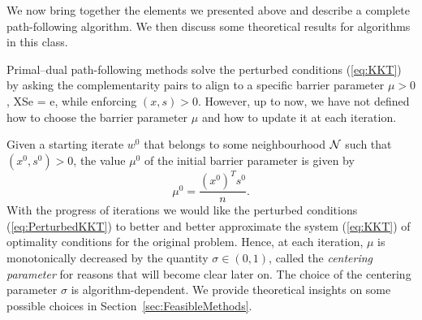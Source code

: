 We now bring together the elements we presented above and describe
a complete path-following algorithm. We then discuss some
theoretical results for algorithms in this class.

Primal--dual path-following methods solve the perturbed \KKT
conditions (\ref{eq:KKT}) by asking the complementarity pairs to align 
to a specific barrier parameter $\mu > 0$,
\be  \label{eq:PerturbedComplementarity}
XSe = \mu e,
\ee
while enforcing $(x,s)>0$.
However, up to now, we have not defined how to choose the
barrier parameter $\mu$ and how to update it at each iteration.

Given a starting iterate $w^0$ that belongs to some neighbourhood $\mathcal{N}$
such that $(x^0, s^0) > 0$, the value $\mu^0$ 
of the initial barrier parameter is given by
\[
   \mu^0 = \frac{(x^0)^T s^0}{n}.
\]
With the progress of iterations 
we would like the perturbed \KKT conditions (\ref{eq:PerturbedKKT}) 
to better and better approximate
the system (\ref{eq:KKT}) of optimality conditions for the original
problem.
Hence, at each iteration, $\mu$ is monotonically decreased by the quantity
$\sigma \in (0,1)$, called the {\em centering parameter} for reasons that
will become clear later on.
The choice of the centering parameter $\sigma$ 
is algorithm-dependent. We provide theoretical insights on some
possible choices in Section~\ref{sec:FeasibleMethods}.


